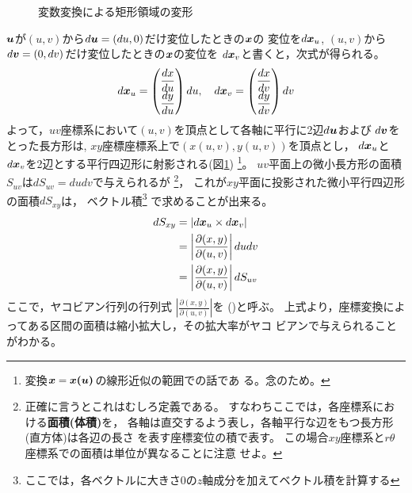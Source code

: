 \documentclass[twocolumn,11pt]{jarticle}
\begin{document}
\begin{figure}[tb]
  \begin{center}
    \caption{変数変換による矩形領域の変形}
    \label{fig:Suv2Sxy}
  \end{center}
\end{figure}
$\boldsymbol{u}$が$(u,v)$から$d\boldsymbol{u}=(du,0)$だけ変位したときの$\boldsymbol{x}$の
変位を$d\boldsymbol{x}_u$,
$(u,v)$から$d\boldsymbol{v}=(0,dv)$だけ変位したときの$\boldsymbol{x}$の変位を
$d\boldsymbol{x}_v$と書くと，次式が得られる。
\begin{align}
  d\boldsymbol{x}_u=
  \begin{pmatrix}
  \displaystyle\frac{dx}{du}\\
  \displaystyle\frac{dy}{du}
  \end{pmatrix}
  du,\quad
  d\boldsymbol{x}_v=
  \begin{pmatrix}
  \displaystyle\frac{dx}{dv}\\
  \displaystyle\frac{dy}{dv}
  \end{pmatrix}
  dv
\end{align}
よって，$uv$座標系において$(u,v)$を頂点として各軸に平行に2辺$d\boldsymbol{u}$および
$d\boldsymbol{v}$をとった長方形は, 
$xy$座標座標系上で$(x(u,v),y(u,v))$を頂点とし，
$d\boldsymbol{x}_u$と$d\boldsymbol{x}_v$を2辺とする平行四辺形に射影される(図\ref{fig:Suv2Sxy})
\footnote{変換$\boldsymbol{x}=\boldsymbol{x(\boldsymbol{u})}$の線形近似の範囲での話であ
  る。念のため。}。
$uv$平面上の微小長方形の面積$S_{uv}$は$dS_{uv}=dudv$で与えられるが
\footnote{正確に言うとこれはむしろ定義である。
  すなわちここでは，各座標系における\textbf{面積(体積)}を，
  各軸は直交するよう表し，各軸平行な辺をもつ長方形(直方体)は各辺の長さ
  を表す座標変位の積で表す。
  この場合$xy$座標系と$r\theta$座標系での面積は単位が異なることに注意
  せよ。}，
これが$xy$平面に投影された微小平行四辺形の面積$dS_{xy}$は，
ベクトル積\footnote{
ここでは，各ベクトルに大きさ0の$z$軸成分を加えてベクトル積を計算する}
で求めることが出来る。
\begin{align}
dS_{xy}&=|d\boldsymbol{x}_u\times d\boldsymbol{x}_v|\notag\\
&=\left|\frac{\partial(x,y)}{\partial(u,v)}\right|dudv\notag\\
&=\left|\frac{\partial(x,y)}{\partial(u,v)}\right|dS_{uv}\notag
\end{align}
ここで，ヤコビアン行列の行列式
$\left|\frac{\partial(x,y)}{\partial(u,v)}\right|$を
()と呼ぶ。
上式より，座標変換によってある区間の面積は縮小拡大し，その拡大率がヤコ
ビアンで与えられることがわかる。
\end{document}

